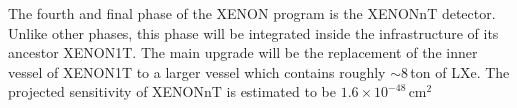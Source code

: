 The fourth and final phase of the XENON program is the XENONnT detector. Unlike other phases, this phase will be integrated inside the infrastructure of its ancestor XENON1T. The main upgrade will be the replacement of the inner vessel of XENON1T to a larger vessel which contains roughly $\sim8$\,ton of LXe. The projected sensitivity of XENONnT is estimated to be $1.6\times10^{-48}$\,cm$^{2}$ 
%
%
